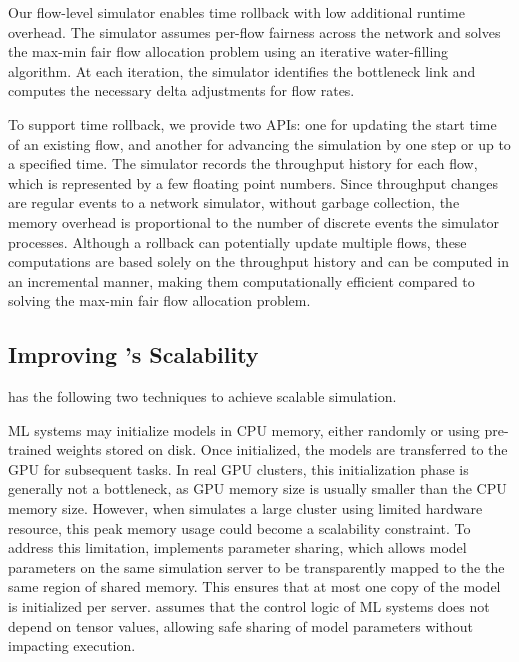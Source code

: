  Our flow-level simulator enables time rollback with low additional runtime overhead. The simulator assumes per-flow fairness across the network and solves the max-min fair flow allocation problem using an iterative water-filling algorithm. At each iteration, the simulator identifies the bottleneck link and computes the necessary delta adjustments for flow rates.

To support time rollback, we provide two APIs: one for updating the start time of an existing flow, and another for advancing the simulation by one step or up to a specified time. The simulator records the throughput history for each flow, which is represented by a few floating point numbers. Since throughput changes are regular events to a network simulator, without garbage collection, the memory overhead is proportional to the number of discrete events the simulator processes.
Although a rollback can potentially update multiple flows, these computations are based solely on the throughput history and can be computed in an incremental manner, making them computationally efficient compared to solving the max-min fair flow allocation problem.


\subsection{Improving \sys's Scalability}
\label{sec:scalability}

\sys has the following two techniques to achieve scalable simulation.

 ML systems may initialize models in CPU memory, either randomly or using pre-trained weights stored on disk. Once initialized, the models are transferred to the GPU for subsequent tasks. In real GPU clusters, this initialization phase is generally not a bottleneck, as GPU memory size is usually smaller than the CPU memory size. However, when \sys simulates a large cluster using limited hardware resource, this peak memory usage could become a scalability constraint.
To address this limitation, \sys implements parameter sharing, which allows model parameters on the same simulation server to be transparently mapped to the the same region of shared memory.
This ensures that at most one copy of the model is initialized per server. \sys assumes that the control logic of ML systems does not depend on tensor values, allowing safe sharing of model parameters without impacting execution.


